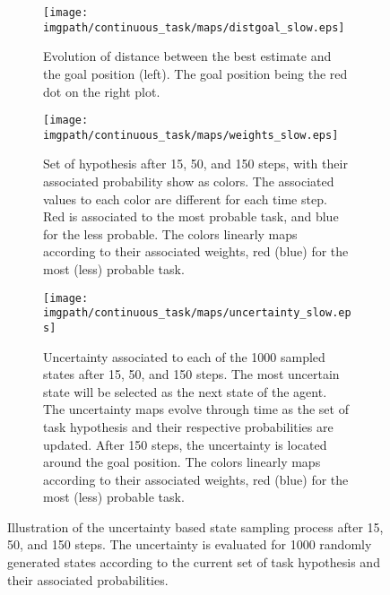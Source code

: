 \begin{figure}[!p]
\centering
    \begin{subfigure}[b]{\columnwidth}
        \centering
        \texttt{[image: \\imgpath/continuous\_task/maps/distgoal\_slow.eps]}
        \caption{Evolution of distance between the best estimate and the goal position (left). The goal position being the red dot on the right plot.}
        \label{fig:continuoustaskexampleslowdist}
    \end{subfigure}
    \begin{subfigure}[b]{\columnwidth}
        \centering
        \texttt{[image: \\imgpath/continuous\_task/maps/weights\_slow.eps]}
        \caption{Set of hypothesis after 15, 50, and 150 steps, with their associated probability show as colors. The associated values to each color are different for each time step. Red is associated to the most probable task, and blue for the less probable. The colors linearly maps according to their associated weights, red (blue) for the most (less) probable task.}
        \label{fig:continuoustaskexampleslowweights}
    \end{subfigure}
    \begin{subfigure}[b]{\columnwidth}
        \centering
        \texttt{[image: \\imgpath/continuous\_task/maps/uncertainty\_slow.eps]}
        \caption{Uncertainty associated to each of the 1000 sampled states after 15, 50, and 150 steps. The most uncertain state will be selected as the next state of the agent. The uncertainty maps evolve through time as the set of task hypothesis and their respective probabilities are updated. After 150 steps, the uncertainty is located around the goal position. The colors linearly maps according to their associated weights, red (blue) for the most (less) probable task.}
        \label{fig:continuoustaskexampleslowuncertainty}
    \end{subfigure}
\caption{Illustration of the uncertainty based state sampling process after 15, 50, and 150 steps. The uncertainty is evaluated for 1000 randomly generated states according to the current set of task hypothesis and their associated probabilities.}
\label{fig:continuoustasktasksamplingexampleslow}
\end{figure}


